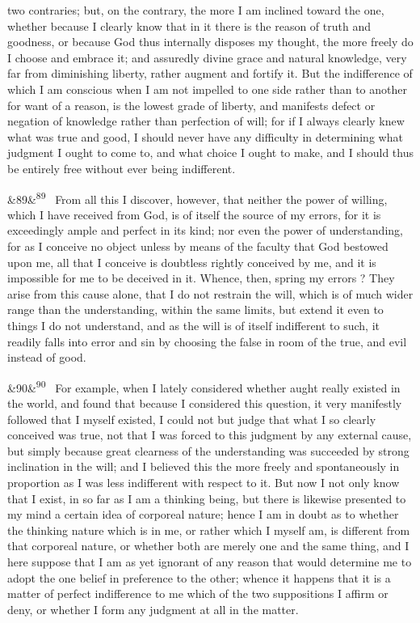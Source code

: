 \documentclass[12pt]{article}
\newcommand{\para}[1][]{\par\noindent\ifx&#1&\else\textsuperscript{\footnotesize #1}~\fi}
\begin{document}
two contraries; but, on the contrary, the more I am inclined toward the one, whether because I clearly know that in it there is the reason of truth and goodness, or because God thus internally disposes my thought, the more freely do I choose and embrace it; and assuredly divine grace and natural knowledge, very far from diminishing liberty, rather augment and fortify it. But the indifference of which I am conscious when I am not impelled to one side rather than to another for want of a reason, is the lowest grade of liberty, and manifests defect or negation of knowledge rather than perfection of will; for if I always clearly knew what was true and good, I should never have any difficulty in determining what judgment I ought to come to, and what choice I ought to make, and I should thus be entirely free without ever being indifferent.

\para[89] From all this I discover, however, that neither the power of willing, which I have received from God, is of itself the source of my errors, for it is exceedingly ample and perfect in its kind; nor even the power of understanding, for as I conceive no object unless by means of the faculty that God bestowed upon me, all that I conceive is doubtless rightly conceived by me, and it is impossible for me to be deceived in it. Whence, then, spring my errors ? They arise from this cause alone, that I do not restrain the will, which is of much wider range than the understanding, within the same limits, but extend it even to things I do not understand, and as the will is of itself indifferent to such, it readily falls into error and sin by choosing the false in room of the true, and evil instead of good.

\para[90] For example, when I lately considered whether aught really existed in the world, and found that because I considered this question, it very manifestly followed that I myself existed, I could not but judge that what I so clearly conceived was true, not that I was forced to this judgment by any external cause, but simply because great clearness of the understanding was succeeded by strong inclination in the will; and I believed this the more freely and spontaneously in proportion as I was less indifferent with respect to it. But now I not only know that I exist, in so far as I am a thinking being, but there is likewise presented to my mind a certain idea of corporeal nature; hence I am in doubt as to whether the thinking nature which is in me, or rather which I myself am, is different from that corporeal nature, or whether both are merely one and the same thing, and I here suppose that I am as yet ignorant of any reason that would determine me to adopt the one belief in preference to the other; whence it happens that it is a matter of perfect indifference to me which of the two suppositions I affirm or deny, or whether I form any judgment at all in the matter.
\end{document}
